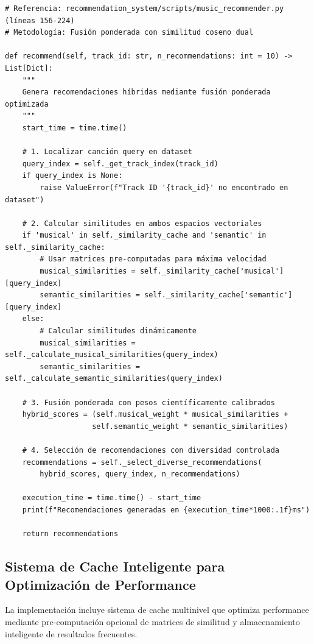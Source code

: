 \documentclass[12pt,a4paper]{report}
\begin{document}
\begin{lstlisting}[caption={Metodología de Fusión Ponderada Optimizada}]
# Referencia: recommendation_system/scripts/music_recommender.py (líneas 156-224)
# Metodología: Fusión ponderada con similitud coseno dual

def recommend(self, track_id: str, n_recommendations: int = 10) -> List[Dict]:
    """
    Genera recomendaciones híbridas mediante fusión ponderada optimizada
    """
    start_time = time.time()

    # 1. Localizar canción query en dataset
    query_index = self._get_track_index(track_id)
    if query_index is None:
        raise ValueError(f"Track ID '{track_id}' no encontrado en dataset")

    # 2. Calcular similitudes en ambos espacios vectoriales
    if 'musical' in self._similarity_cache and 'semantic' in self._similarity_cache:
        # Usar matrices pre-computadas para máxima velocidad
        musical_similarities = self._similarity_cache['musical'][query_index]
        semantic_similarities = self._similarity_cache['semantic'][query_index]
    else:
        # Calcular similitudes dinámicamente
        musical_similarities = self._calculate_musical_similarities(query_index)
        semantic_similarities = self._calculate_semantic_similarities(query_index)

    # 3. Fusión ponderada con pesos científicamente calibrados
    hybrid_scores = (self.musical_weight * musical_similarities +
                    self.semantic_weight * semantic_similarities)

    # 4. Selección de recomendaciones con diversidad controlada
    recommendations = self._select_diverse_recommendations(
        hybrid_scores, query_index, n_recommendations)

    execution_time = time.time() - start_time
    print(f"Recomendaciones generadas en {execution_time*1000:.1f}ms")

    return recommendations
\end{lstlisting}

\subsection{Sistema de Cache Inteligente para Optimización de Performance}

La implementación incluye sistema de cache multinivel que optimiza performance mediante pre-computación opcional de matrices de similitud y almacenamiento inteligente de resultados frecuentes.
\end{document}
